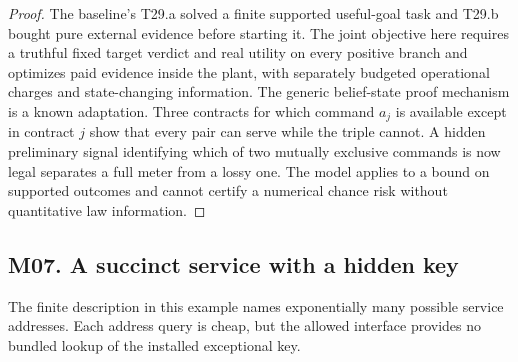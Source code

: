 \begin{proof}
The baseline's T29.a solved a finite supported useful-goal task and T29.b bought pure external evidence before starting it. The joint objective here requires a truthful fixed target verdict and real utility on every positive branch and optimizes paid evidence inside the plant, with separately budgeted operational charges and state-changing information. The generic belief-state proof mechanism is a known adaptation. Three contracts for which command \(a_j\) is available except in contract \(j\) show that every pair can serve while the triple cannot. A hidden preliminary signal identifying which of two mutually exclusive commands is now legal separates a full meter from a lossy one. The model applies to a bound on supported outcomes and cannot certify a numerical chance risk without quantitative law information.

\end{proof}

\subsection{M07. A succinct service with a hidden key}

\label{ext:m07}

The finite description in this example names exponentially many possible service addresses. Each address query is cheap, but the allowed interface provides no bundled lookup of the installed exceptional key.

